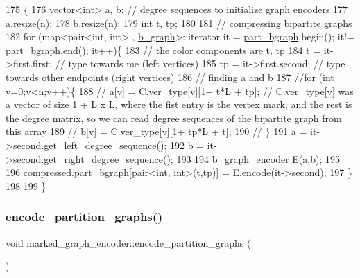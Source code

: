 \begin{DoxyCode}
175 \{
176   vector<int> a, b; \textcolor{comment}{// degree sequences to initialize graph encoders }
177   a.resize(\hyperlink{classmarked__graph__encoder_a4c66d9fdbc14c97523715aac7e4511cb}{n});
178   b.resize(\hyperlink{classmarked__graph__encoder_a4c66d9fdbc14c97523715aac7e4511cb}{n});
179   \textcolor{keywordtype}{int} t, tp;
180 
181   \textcolor{comment}{// compressing bipartite graphs }
182   \textcolor{keywordflow}{for} (map<pair<int, int> , \hyperlink{classb__graph}{b\_graph}>::iterator it = \hyperlink{classmarked__graph__encoder_a5faebef707fb681c0b6c2ccf64abc04c}{part\_bgraph}.begin(); it!=
      \hyperlink{classmarked__graph__encoder_a5faebef707fb681c0b6c2ccf64abc04c}{part\_bgraph}.end(); it++)\{
183     \textcolor{comment}{// the color components are t, tp}
184     t = it->first.first; \textcolor{comment}{// type towards me (left vertices)}
185     tp = it->first.second; \textcolor{comment}{// type towards other endpoints (right vertices)}
186     \textcolor{comment}{// finding a and b}
187     \textcolor{comment}{//for (int v=0;v<n;v++)\{}
188     \textcolor{comment}{//  a[v] = C.ver\_type[v][1+ t*L + tp]; // C.ver\_type[v] was a vector of size 1 + L x L, where the fist
       entry is the vertex mark, and the rest is the degree matrix, so we can read degree sequences of the
       bipartite graph from this array}
189     \textcolor{comment}{//  b[v] = C.ver\_type[v][1+ tp*L + t];}
190     \textcolor{comment}{// \}}
191     a = it->second.get\_left\_degree\_sequence();
192     b = it->second.get\_right\_degree\_sequence();
193 
194     \hyperlink{classb__graph__encoder}{b\_graph\_encoder} E(a,b);
195 
196     \hyperlink{classmarked__graph__encoder_ac2ded200860fdd2321f86dd76b28bcb3}{compressed}.\hyperlink{classmarked__graph__compressed_a7b3267063fba30b45eb21b3ba4e07536}{part\_bgraph}[pair<int, int>(t,tp)] = E.encode(it->second);
197   \}
198 
199 \}
\end{DoxyCode}
\mbox{\label{classmarked__graph__encoder_a654463d4b256b84225f5944b5e361ebf}} 
\subsubsection{\texorpdfstring{encode\+\_\+partition\+\_\+graphs()}{encode\_partition\_graphs()}}
{\footnotesize\ttfamily void marked\+\_\+graph\+\_\+encoder\+::encode\+\_\+partition\+\_\+graphs (\begin{DoxyParamCaption}{ }\end{DoxyParamCaption})\hspace{0.3cm}{\ttfamily [private]}}



